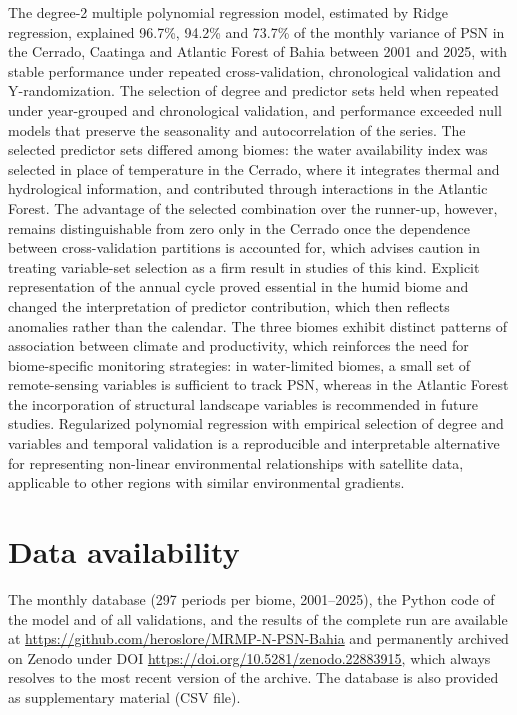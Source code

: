 \documentclass[a4paper,fleqn]{cas-sc}
\begin{document}
The degree-2 multiple polynomial regression model, estimated by Ridge regression, explained 96.7\%, 94.2\% and 73.7\% of the monthly variance of PSN in the Cerrado, Caatinga and Atlantic Forest of Bahia between 2001 and 2025, with stable performance under repeated cross-validation, chronological validation and Y-randomization. The selection of degree and predictor sets held when repeated under year-grouped and chronological validation, and performance exceeded null models that preserve the seasonality and autocorrelation of the series. The selected predictor sets differed among biomes: the water availability index was selected in place of temperature in the Cerrado, where it integrates thermal and hydrological information, and contributed through interactions in the Atlantic Forest. The advantage of the selected combination over the runner-up, however, remains distinguishable from zero only in the Cerrado once the dependence between cross-validation partitions is accounted for, which advises caution in treating variable-set selection as a firm result in studies of this kind. Explicit representation of the annual cycle proved essential in the humid biome and changed the interpretation of predictor contribution, which then reflects anomalies rather than the calendar. The three biomes exhibit distinct patterns of association between climate and productivity, which reinforces the need for biome-specific monitoring strategies: in water-limited biomes, a small set of remote-sensing variables is sufficient to track PSN, whereas in the Atlantic Forest the incorporation of structural landscape variables is recommended in future studies. Regularized polynomial regression with empirical selection of degree and variables and temporal validation is a reproducible and interpretable alternative for representing non-linear environmental relationships with satellite data, applicable to other regions with similar environmental gradients.

\section*{Data availability}
The monthly database (297 periods per biome, 2001--2025), the Python code of the model and of all validations, and the results of the complete run are available at \url{https://github.com/heroslore/MRMP-N-PSN-Bahia} and permanently archived on Zenodo under DOI \url{https://doi.org/10.5281/zenodo.22883915}, which always resolves to the most recent version of the archive. The database is also provided as supplementary material (CSV file).
\end{document}
